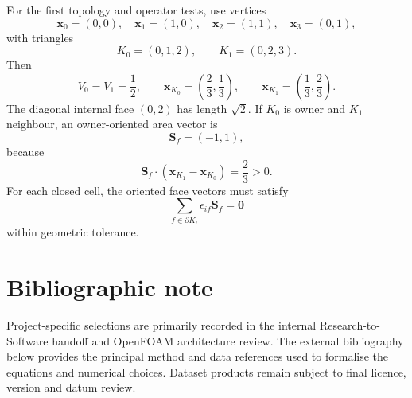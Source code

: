 \documentclass[11pt,a4paper]{article}
\newcommand{\vect}[1]{\bm{#1}}
\begin{document}
For the first topology and operator tests, use vertices
\begin{equation}
  \vect x_0=(0,0),\quad
  \vect x_1=(1,0),\quad
  \vect x_2=(1,1),\quad
  \vect x_3=(0,1),
\end{equation}
with triangles
\begin{equation}
  K_0=(0,1,2),\qquad K_1=(0,2,3).
\end{equation}
Then
\begin{equation}
  V_0=V_1=\frac{1}{2},
  \qquad
  \vect x_{K_0}=\left(\frac{2}{3},\frac{1}{3}\right),
  \qquad
  \vect x_{K_1}=\left(\frac{1}{3},\frac{2}{3}\right).
\end{equation}
The diagonal internal face $(0,2)$ has length $\sqrt2$. If $K_0$ is owner and $K_1$ neighbour, an owner-oriented area vector is
\begin{equation}
  \vect S_f=(-1,1),
\end{equation}
because
\begin{equation}
  \vect S_f\cdot(\vect x_{K_1}-\vect x_{K_0})=\frac{2}{3}>0.
\end{equation}
For each closed cell, the oriented face vectors must satisfy
\begin{equation}
  \sum_{f\in\partial K_i}\epsilon_{if}\vect S_f=\vect 0
\end{equation}
within geometric tolerance.

\section{Bibliographic note}

Project-specific selections are primarily recorded in the internal Research-to-Software handoff and OpenFOAM architecture review. The external bibliography below provides the principal method and data references used to formalise the equations and numerical choices. Dataset products remain subject to final licence, version and datum review.
\end{document}
